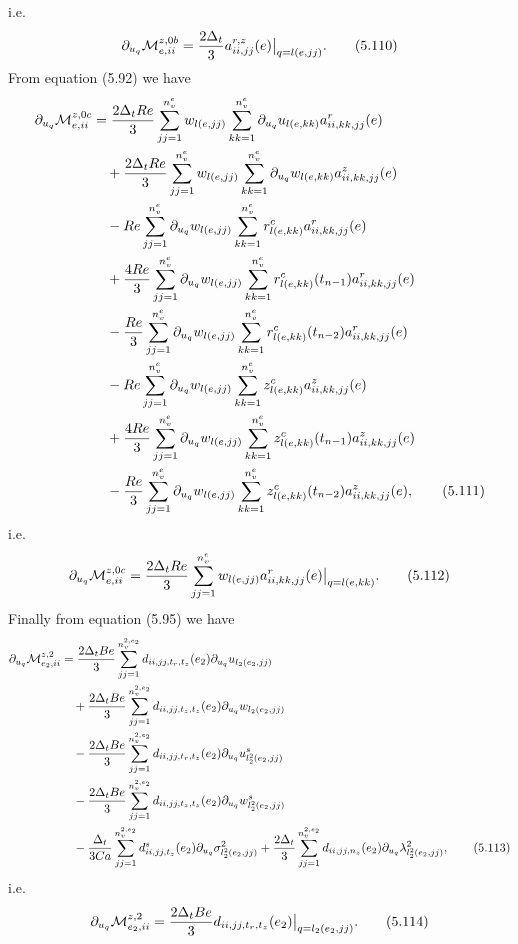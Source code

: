 \documentclass{article}
\begin{document}
i.e.
\begin{equation}
\partial_{u_q}\mathcal{M}_{e,ii}^{z,0b} = \frac{2\Delta_t}{3} a_{ii,jj}^{r,z}(e) \big|_{q=l(e,jj)}. \tag{5.110}
\end{equation}
From equation (5.92) we have
\begin{align}
\partial_{u_q}\mathcal{M}_{e,ii}^{z,0c} &= \frac{2\Delta_t Re}{3} \sum_{jj=1}^{n_v^e} w_{l(e,jj)} \sum_{kk=1}^{n_v^e} \partial_{u_q} u_{l(e,kk)} a_{ii,kk,jj}^r(e) \nonumber\\
&\quad + \frac{2\Delta_t Re}{3} \sum_{jj=1}^{n_v^e} w_{l(e,jj)} \sum_{kk=1}^{n_v^e} \partial_{u_q} w_{l(e,kk)} a_{ii,kk,jj}^z(e) \nonumber\\
&\quad - Re \sum_{jj=1}^{n_v^e} \partial_{u_q} w_{l(e,jj)} \sum_{kk=1}^{n_v^e} r_{l(e,kk)}^c a_{ii,kk,jj}^r(e) \nonumber\\
&\quad + \frac{4Re}{3} \sum_{jj=1}^{n_v^e} \partial_{u_q} w_{l(e,jj)} \sum_{kk=1}^{n_v^e} r_{l(e,kk)}^c(t_{n-1}) a_{ii,kk,jj}^r(e) \nonumber\\
&\quad - \frac{Re}{3} \sum_{jj=1}^{n_v^e} \partial_{u_q} w_{l(e,jj)} \sum_{kk=1}^{n_v^e} r_{l(e,kk)}^c(t_{n-2}) a_{ii,kk,jj}^r(e) \nonumber\\
&\quad - Re \sum_{jj=1}^{n_v^e} \partial_{u_q} w_{l(e,jj)} \sum_{kk=1}^{n_v^e} z_{l(e,kk)}^c a_{ii,kk,jj}^z(e) \nonumber\\
&\quad + \frac{4Re}{3} \sum_{jj=1}^{n_v^e} \partial_{u_q} w_{l(e,jj)} \sum_{kk=1}^{n_v^e} z_{l(e,kk)}^c(t_{n-1}) a_{ii,kk,jj}^z(e) \nonumber\\
&\quad - \frac{Re}{3} \sum_{jj=1}^{n_v^e} \partial_{u_q} w_{l(e,jj)} \sum_{kk=1}^{n_v^e} z_{l(e,kk)}^c(t_{n-2}) a_{ii,kk,jj}^z(e), \tag{5.111}
\end{align}
i.e.
\begin{equation}
\partial_{u_q}\mathcal{M}_{e,ii}^{z,0c} = \frac{2\Delta_t Re}{3} \sum_{jj=1}^{n_v^e} w_{l(e,jj)} a_{ii,kk,jj}^r(e) \big|_{q=l(e,kk)}. \tag{5.112}
\end{equation}
Finally from equation (5.95) we have
\begin{align}
\partial_{u_q}\mathcal{M}_{e_2,ii}^{z,2} &= \frac{2\Delta_t Be}{3} \sum_{jj=1}^{n_v^{2,e_2}} d_{ii,jj,t_r,t_z}(e_2) \partial_{u_q} u_{l_2(e_2,jj)} \nonumber\\
&\quad + \frac{2\Delta_t Be}{3} \sum_{jj=1}^{n_v^{2,e_2}} d_{ii,jj,t_z,t_z}(e_2) \partial_{u_q} w_{l_2(e_2,jj)} \nonumber\\
&\quad - \frac{2\Delta_t Be}{3} \sum_{jj=1}^{n_v^{2,e_2}} d_{ii,jj,t_r,t_z}(e_2) \partial_{u_q} u_{l_2^2(e_2,jj)}^s \nonumber\\
&\quad - \frac{2\Delta_t Be}{3} \sum_{jj=1}^{n_v^{2,e_2}} d_{ii,jj,t_z,t_z}(e_2) \partial_{u_q} w_{l_2^2(e_2,jj)}^s \nonumber\\
&\quad - \frac{\Delta_t}{3Ca} \sum_{jj=1}^{n_v^{2,e_2}} d_{ii,jj,t_z}^s(e_2) \partial_{u_q} \sigma_{l_2^2(e_2,jj)}^2 + \frac{2\Delta_t}{3} \sum_{jj=1}^{n_v^{2,e_2}} d_{ii,jj,n_z}(e_2) \partial_{u_q} \lambda_{l_2^2(e_2,jj)}^2, \tag{5.113}
\end{align}
i.e.
\begin{equation}
\partial_{u_q}\mathcal{M}_{e_2,ii}^{z,2} = \frac{2\Delta_t Be}{3} d_{ii,jj,t_r,t_z}(e_2) \big|_{q=l_2(e_2,jj)}. \tag{5.114}
\end{equation}
\end{document}
